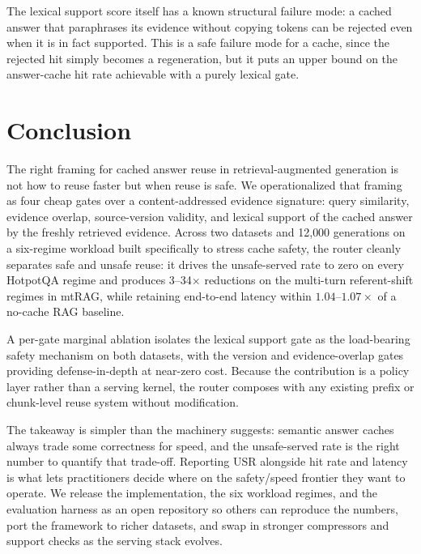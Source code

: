 \documentclass[11pt]{article}
\begin{document}
The lexical support score itself has a known structural failure mode:
a cached answer that paraphrases its evidence without copying tokens
can be rejected even when it is in fact supported. This is a safe
failure mode for a cache, since the rejected hit simply becomes a
regeneration, but it puts an upper bound on the answer-cache hit rate
achievable with a purely lexical gate.

\FloatBarrier
\section{Conclusion}
The right framing for cached answer reuse in retrieval-augmented
generation is not how to reuse faster but when reuse is safe. We
operationalized that framing as four cheap gates over a
content-addressed evidence signature: query similarity, evidence
overlap, source-version validity, and lexical support of the cached
answer by the freshly retrieved evidence. Across two datasets and
12{,}000 generations on a six-regime workload built specifically to
stress cache safety, the router cleanly separates safe and unsafe
reuse: it drives the unsafe-served rate to zero on every HotpotQA
regime and produces 3--34$\times$ reductions on the multi-turn
referent-shift regimes in mtRAG, while retaining end-to-end latency
within $1.04$--$1.07\times$ of a no-cache RAG baseline.

A per-gate marginal ablation isolates the lexical support gate as the
load-bearing safety mechanism on both datasets, with the version and
evidence-overlap gates providing defense-in-depth at near-zero cost.
Because the contribution is a policy layer rather than a serving
kernel, the router composes with any existing prefix or chunk-level
reuse system without modification.

The takeaway is simpler than the machinery suggests: semantic answer
caches always trade some correctness for speed, and the unsafe-served
rate is the right number to quantify that trade-off. Reporting USR
alongside hit rate and latency is what lets practitioners decide
where on the safety/speed frontier they want to operate. We release
the implementation, the six workload regimes, and the evaluation
harness as an open repository so others can reproduce the numbers,
port the framework to richer datasets, and swap in stronger
compressors and support checks as the serving stack evolves.

\FloatBarrier

\end{document}
